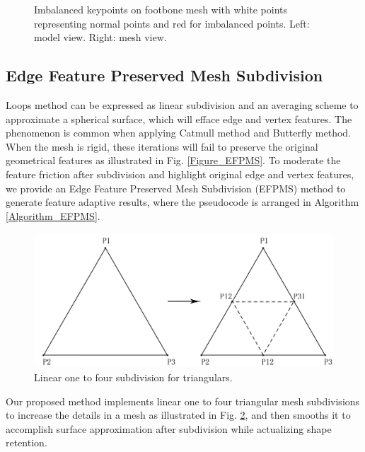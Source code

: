 \documentclass[10pt, conference, compsocconf]{IEEEtran}
\begin{document}
\begin{figure}[htbp]
\begin{minipage}[h]{0.48\linewidth}
      \end{minipage}
  \caption{Imbalanced keypoints on footbone mesh with white points representing normal points and red for imbalanced points. Left: model view. Right: mesh view.}\label{Figure_Keypoints}
\end{figure}


\subsection{Edge Feature Preserved Mesh Subdivision}
Loops method \cite{Loop1987Smooth} can be expressed as linear subdivision and an averaging scheme to approximate a spherical surface, which will efface edge and vertex features. The phenomenon is common when applying Catmull method and Butterfly method. When the mesh is rigid, these iterations will fail to preserve the original geometrical features as illustrated in Fig. \ref{Figure_EFPMS}. To moderate the feature friction after subdivision and highlight original edge and vertex features, we provide an Edge Feature Preserved Mesh Subdivision (EFPMS) method to generate feature adaptive results, where the pseudocode is arranged in Algorithm \ref{Algorithm_EFPMS}.

\begin{figure}[htbp]
  \centering
  \includegraphics[width=0.75\linewidth]{./Figure/LinearSubdivision.png}
  \caption{Linear one to four subdivision for triangulars.}\label{Figure_Linear_Subdivision}
\end{figure}

Our proposed method implements linear one to four triangular mesh subdivisions to increase the details in a mesh as illustrated in Fig. \ref{Figure_Linear_Subdivision}, and then smooths it to accomplish surface approximation after subdivision while actualizing shape retention.
\end{document}
